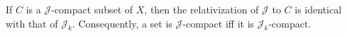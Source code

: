 If $C$ is a $\mathcal{J}$-compact subset of $X$, then the relativization of $\mathcal{J}$ to $C$ is identical with that of $\mathcal{J}_k$. Consequently, a set is $\mathcal{J}$-compact iff it is $\mathcal{J}_k$-compact.
